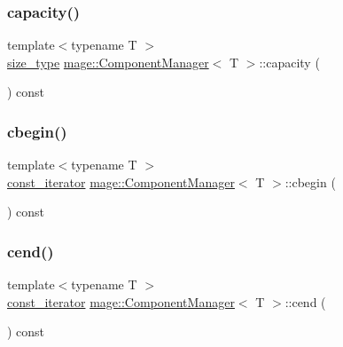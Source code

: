 \subsubsection{\texorpdfstring{capacity()}{capacity()}}
{\footnotesize\ttfamily template$<$typename T $>$ \\
\mbox{\hyperlink{classmage_1_1_component_manager_a6bd219525db9ec9f3adb9259e52674da}{size\+\_\+type}} \mbox{\hyperlink{classmage_1_1_component_manager}{mage\+::\+Component\+Manager}}$<$ T $>$\+::capacity (\begin{DoxyParamCaption}{ }\end{DoxyParamCaption}) const\hspace{0.3cm}{\ttfamily [noexcept]}}

\mbox{\label{classmage_1_1_component_manager_adc13717839d08cb7c2aaa88c6a6bb836}} 
\subsubsection{\texorpdfstring{cbegin()}{cbegin()}}
{\footnotesize\ttfamily template$<$typename T $>$ \\
\mbox{\hyperlink{classmage_1_1_component_manager_acc0d5ab8de4583ae2dd99c7bc0784c95}{const\+\_\+iterator}} \mbox{\hyperlink{classmage_1_1_component_manager}{mage\+::\+Component\+Manager}}$<$ T $>$\+::cbegin (\begin{DoxyParamCaption}{ }\end{DoxyParamCaption}) const\hspace{0.3cm}{\ttfamily [noexcept]}}

\mbox{\label{classmage_1_1_component_manager_a02ffd95f94d2c58c80203b87d3992f98}} 
\subsubsection{\texorpdfstring{cend()}{cend()}}
{\footnotesize\ttfamily template$<$typename T $>$ \\
\mbox{\hyperlink{classmage_1_1_component_manager_acc0d5ab8de4583ae2dd99c7bc0784c95}{const\+\_\+iterator}} \mbox{\hyperlink{classmage_1_1_component_manager}{mage\+::\+Component\+Manager}}$<$ T $>$\+::cend (\begin{DoxyParamCaption}{ }\end{DoxyParamCaption}) const\hspace{0.3cm}{\ttfamily [noexcept]}}

